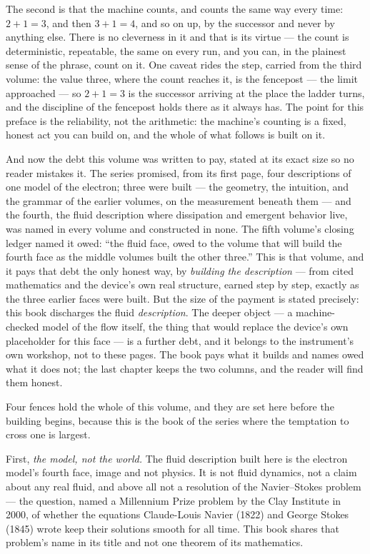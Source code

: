 The second is that the machine counts, and counts the same way every time:
$2 + 1 = 3$, and then $3 + 1 = 4$, and so on up, by the successor and never by
anything else. There is no cleverness in it and that is its virtue --- the
count is deterministic, repeatable, the same on every run, and you can, in the
plainest sense of the phrase, count on it. One caveat rides the step, carried
from the third volume: the value three, where the count reaches it, is the
fencepost --- the limit approached --- so $2 + 1 = 3$ is the successor arriving
at the place the ladder turns, and the discipline of the fencepost holds there
as it always has. The point for this preface is the reliability, not the
arithmetic: the machine's counting is a fixed, honest act you can build on, and
the whole of what follows is built on it.

And now the debt this volume was written to pay, stated at its exact size so no
reader mistakes it. The series promised, from its first page, four descriptions
of one model of the electron; three were built --- the geometry, the intuition,
and the grammar of the earlier volumes, on the measurement beneath them --- and
the fourth, the fluid description where dissipation and emergent behavior live,
was named in every volume and constructed in none. The fifth volume's closing
ledger named it owed: ``the fluid face, owed to the volume that will build the
fourth face as the middle volumes built the other three.'' This is that volume,
and it pays that debt the only honest way, by \emph{building the description} ---
from cited mathematics and the device's own real structure, earned step by step,
exactly as the three earlier faces were built. But the size of the payment is
stated precisely: this book discharges the fluid \emph{description}. The deeper
object --- a machine-checked model of the flow itself, the thing that would
replace the device's own placeholder for this face --- is a further debt, and it
belongs to the instrument's own workshop, not to these pages. The book pays what
it builds and names owed what it does not; the last chapter keeps the two
columns, and the reader will find them honest.

Four fences hold the whole of this volume, and they are set here before the
building begins, because this is the book of the series where the temptation to
cross one is largest.

First, \emph{the model, not the world.} The fluid description built here is the
electron model's fourth face, image and not physics. It is not fluid dynamics,
not a claim about any real fluid, and above all not a resolution of the
Navier--Stokes problem --- the question, named a Millennium Prize problem by the
Clay Institute in 2000, of whether the equations Claude-Louis Navier (1822) and
George Stokes (1845) wrote keep their solutions smooth for all time. This book
shares that problem's name in its title and not one theorem of its mathematics.

